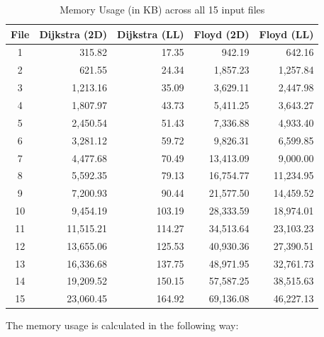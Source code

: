\documentclass[11pt, a4paper]{article}
\begin{document}
\begin{table}[h!]
\centering
\renewcommand{\arraystretch}{1.2}
\begin{tabular}{|c|r|r|r|r|}
\hline
\textbf{File} & \textbf{Dijkstra (2D)} & \textbf{Dijkstra (LL)} & \textbf{Floyd (2D)} & \textbf{Floyd (LL)} \\
\hline
1 & 315.82 & 17.35 & 942.19 & 642.16 \\
2 & 621.55 & 24.34 & 1,857.23 & 1,257.84 \\
3 & 1,213.16 & 35.09 & 3,629.11 & 2,447.98 \\
4 & 1,807.97 & 43.73 & 5,411.25 & 3,643.27 \\
5 & 2,450.54 & 51.43 & 7,336.88 & 4,933.40 \\
6 & 3,281.12 & 59.72 & 9,826.31 & 6,599.85 \\
7 & 4,477.68 & 70.49 & 13,413.09 & 9,000.00 \\
8 & 5,592.35 & 79.13 & 16,754.77 & 11,234.95 \\
9 & 7,200.93 & 90.44 & 21,577.50 & 14,459.52 \\
10 & 9,454.19 & 103.19 & 28,333.59 & 18,974.01 \\
11 & 11,515.21 & 114.27 & 34,513.64 & 23,103.23 \\
12 & 13,655.06 & 125.53 & 40,930.36 & 27,390.51 \\
13 & 16,336.68 & 137.75 & 48,971.95 & 32,761.73 \\
14 & 19,209.52 & 150.15 & 57,587.25 & 38,515.63 \\
15 & 23,060.45 & 164.92 & 69,136.08 & 46,227.13 \\
\hline
\end{tabular}
\caption{Memory Usage (in KB) across all 15 input files}
\label{tab:mem_usage}
\end{table}
\newpage
The memory usage is calculated in the following way:
\end{document}
